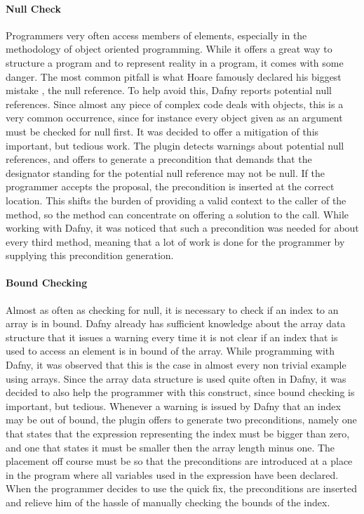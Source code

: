 \paragraph{Null Check}
Programmers very often access members of elements, especially in the methodology of object oriented programming. While it offers a great way to structure a program and to represent reality in a program, it comes with some danger. The most common pitfall is what Hoare famously declared his biggest mistake \cite{hoare}, the null reference. To help avoid this, Dafny reports potential null references. Since almost any piece of complex code deals with objects, this is a very common occurrence, since for instance every object given as an argument must be checked for null first. \newline
It was decided to offer a mitigation of this important, but tedious work. The plugin detects warnings about potential null references, and offers to generate a precondition that demands that the designator standing for the potential null reference may not be null. If the programmer accepts the proposal, the precondition is inserted at the correct location. This shifts the burden of providing a valid context to the caller of the method, so the method can concentrate on offering a solution to the call. While working with Dafny, it was noticed that such a precondition was needed for about every third method, meaning that a lot of work is done for the programmer by supplying this precondition generation.
\paragraph{Bound Checking}
Almost as often as checking for null, it is necessary to check if an index to an array is in bound. Dafny already has sufficient knowledge about the array data structure that it issues a warning every time it is not clear if an index that is used to access an element is in bound of the array. While programming with Dafny, it was observed that this is the case in almost every non trivial example using arrays. Since the array data structure is used quite often in Dafny, it was decided to also help the programmer with this construct, since bound checking is important, but tedious. \newline
Whenever a warning is issued by Dafny that an index may be out of bound, the plugin offers to generate two preconditions, namely one that states that the expression representing the index must be bigger than zero, and one that states it must be smaller then the array length minus one. The placement off course must be so that the preconditions are introduced at a place in the program where all variables used in the expression have been declared. When the programmer decides to use the quick fix, the preconditions are inserted and relieve him of the hassle of manually checking the bounds of the index.
